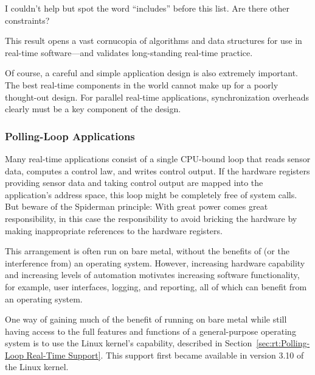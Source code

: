\QuickQuiz{}
	I couldn't help but spot the word ``includes'' before this list.
	Are there other constraints?
 \QuickQuizEnd

This result opens a vast cornucopia of algorithms and data structures
for use in real-time software---and validates long-standing real-time practice.

Of course, a careful and simple application design is also extremely
important.
The best real-time components in the world cannot make up for a
poorly thought-out design.
For parallel real-time applications, synchronization overheads clearly
must be a key component of the design.

\subsubsection{Polling-Loop Applications}
\label{sec:rt:Polling-Loop Applications}

Many real-time applications consist of a single CPU-bound loop that
reads sensor data, computes a control law, and writes control output.
If the hardware registers providing sensor data and taking control
output are mapped into the application's address space, this loop
might be completely free of system calls.
But beware of the Spiderman principle: With great power comes great
responsibility, in this case the responsibility to avoid bricking the
hardware by making inappropriate references to the hardware registers.

This arrangement is often run on bare metal, without the benefits of
(or the interference from) an operating system.
However, increasing hardware capability and increasing levels of
automation motivates increasing software functionality, for example,
user interfaces, logging, and reporting, all of which can benefit from
an operating system.

One way of gaining much of the benefit of running on bare metal while
still having access to the full features and functions of a
general-purpose operating system is to use the Linux kernel's
 capability, described in
Section~\ref{sec:rt:Polling-Loop Real-Time Support}.
This support first became available in version 3.10 of the Linux kernel.

